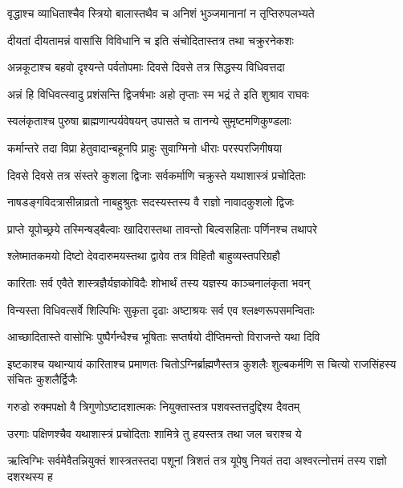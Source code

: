 \twolineshloka
{वृद्धाश्च व्याधिताश्चैव स्त्रियो बालास्तथैव च}
{अनिशं भुञ्जमानानां न तृप्तिरुपलभ्यते} %

\twolineshloka
{दीयतां दीयतामन्नं वासांसि विविधानि च}
{इति संचोदितास्तत्र तथा चक्रुरनेकशः} %

\twolineshloka
{अन्नकूटाश्च बहवो दृश्यन्ते पर्वतोपमाः}
{दिवसे दिवसे तत्र सिद्धस्य विधिवत्तदा} %

\twolineshloka
{अन्नं हि विधिवत्स्वादु प्रशंसन्ति द्विजर्षभाः}
{अहो तृप्ताः स्म भद्रं ते इति शुश्राव राघवः} %

\twolineshloka
{स्वलंकृताश्च पुरुषा ब्राह्मणान्पर्यवेषयन्}
{उपासते च तानन्ये सुमृष्टमणिकुण्डलाः} %

\twolineshloka
{कर्मान्तरे तदा विप्रा हेतुवादान्बहूनपि}
{प्राहुः सुवाग्मिनो धीराः परस्परजिगीषया} %

\twolineshloka
{दिवसे दिवसे तत्र संस्तरे कुशला द्विजाः}
{सर्वकर्माणि चक्रुस्ते यथाशास्त्रं प्रचोदिताः} %

\twolineshloka
{नाषडङ्गविदत्रासीन्नाव्रतो नाबहुश्रुतः}
{सदस्यस्तस्य वै राज्ञो नावादकुशलो द्विजः} %

\twolineshloka
{प्राप्ते यूपोच्छ्रये तस्मिन्षड्बैल्वाः खादिरास्तथा}
{तावन्तो बिल्वसहिताः पर्णिनश्च तथापरे} %

\twolineshloka
{श्लेष्मातकमयो दिष्टो देवदारुमयस्तथा}
{द्वावेव तत्र विहितौ बाहुव्यस्तपरिग्रहौ} %

\twolineshloka
{कारिताः सर्व एवैते शास्त्रज्ञैर्यज्ञकोविदैः}
{शोभार्थं तस्य यज्ञस्य काञ्चनालंकृता भवन्} %

\twolineshloka
{विन्यस्ता विधिवत्सर्वे शिल्पिभिः सुकृता दृढाः}
{अष्टाश्रयः सर्व एव श्लक्ष्णरूपसमन्विताः} %

\twolineshloka
{आच्छादितास्ते वासोभिः पुष्पैर्गन्धैश्च भूषिताः}
{सप्तर्षयो दीप्तिमन्तो विराजन्ते यथा दिवि} %

\threelineshloka
{इष्टकाश्च यथान्यायं कारिताश्च प्रमाणतः}
{चितोऽग्निर्ब्राह्मणैस्तत्र कुशलैः शुल्बकर्मणि}
{स चित्यो राजसिंहस्य संचितः कुशलैर्द्विजैः} %

\twolineshloka
{गरुडो रुक्मपक्षो वै त्रिगुणोऽष्टादशात्मकः}
{नियुक्तास्तत्र पशवस्तत्तदुद्दिश्य दैवतम्} %

\twolineshloka
{उरगाः पक्षिणश्चैव यथाशास्त्रं प्रचोदिताः}
{शामित्रे तु हयस्तत्र तथा जल चराश्च ये} %

\threelineshloka
{ऋत्विग्भिः सर्वमेवैतन्नियुक्तं शास्त्रतस्तदा}
{पशूनां त्रिशतं तत्र यूपेषु नियतं तदा}
{अश्वरत्नोत्तमं तस्य राज्ञो दशरथस्य ह} %

